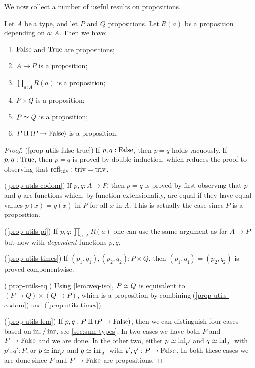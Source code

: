 We now collect a number of useful results on propositions.

\begin{lemma}\label{lem:prop-utils}
Let $A$ be a type, and let $P$ and $Q$ propositions.
Let $R(a)$ be a proposition depending on $a:A$. Then we have:
\begin{enumerate}
\item\label{prop-utils-false-true} $\mathrm{False}$ and $\mathrm{True}$ are propositions;
\item\label{prop-utils-codom} $A\to P$ is a proposition;
\item\label{prop-utils-pi} $\prod_{a:A} R(a)$ is a proposition;
\item\label{prop-utils-times} $P\times Q$ is a proposition;
\item\label{prop-utils-eq} $P \simeq Q$ is a proposition;
\item\label{prop-utils-lem} $P \amalg (P\to\mathrm{False})$ is a proposition.
\end{enumerate}
\end{lemma}

\begin{proof}
(\ref{prop-utils-false-true})
If $p,q : \mathrm{False}$, then $p=q$ holds vacuously.
If $p,q : \mathrm{True}$, then $p=q$ is proved by double induction,
which reduces the proof to observing that $\refl{\triv}: \triv=\triv$.

(\ref{prop-utils-codom})
If $p,q : A\to P$, then $p=q$ is proved by first observing that $p$ and $q$
are functions which, by function extensionality, are equal if they have
equal values $p(x) = q(x)$ in $P$ for all $x$ in $A$. This is
actually the case since $P$ is a proposition.

(\ref{prop-utils-pi})
If $p,q : \prod_{a:A} R(a)$ one can use the same argument as for $A\to P$
but now with \emph{dependent} functions $p,q$.

(\ref{prop-utils-times})
If $(p_1,q_1),(p_2,q_2) : P\times Q$, then $(p_1,q_1)=(p_2,q_2)$
is proved componentwise. 

(\ref{prop-utils-eq})
Using \cref{lem:weq-iso}, $P \simeq Q$ is equivalent to
$(P\to Q)\times(Q\to P)$, which is a proposition by 
combining (\ref{prop-utils-codom}) and (\ref{prop-utils-times}).

(\ref{prop-utils-lem}) 
If $p,q : P\amalg (P\to\mathrm{False})$, then we can distinguish four cases
based on $\inl{}/\inr{}$, see \cref{sec:sum-types}. In two cases
we have both $P$ and $P\to\mathrm{False}$ and we are done. In the other two,
either $p\jdeq \inl{p'}$ and $q\jdeq \inl{q'}$ with $p',q':P$,
or $p\jdeq \inr{p'}$ and $q\jdeq \inr{q'}$ with $p',q':P\to\mathrm{False}$.
In both these cases we are done since $P$ and $P\to\mathrm{False}$ 
are propositions.
\end{proof}


